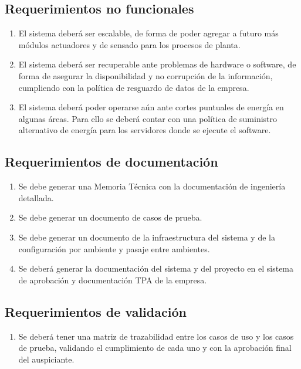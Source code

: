 \subsection{Requerimientos no funcionales}
\begin{enumerate}[label=2.\arabic*]
\item El sistema deberá ser escalable, de forma de poder agregar a futuro más módulos actuadores y de sensado para los procesos de planta.
\item El sistema deberá ser recuperable ante problemas de hardware o software, de forma de asegurar la disponibilidad y no corrupción de la información, cumpliendo con la política de resguardo de datos de la empresa.
\item El sistema deberá poder operarse aún ante cortes puntuales de energía en algunas áreas. Para ello se deberá contar con una política de suministro alternativo de energía para los servidores donde se ejecute el software. 
\end{enumerate}
\subsection{Requerimientos de documentación}
\begin{enumerate}[label=3.\arabic*]
\item Se debe generar una Memoria Técnica con la documentación de ingeniería detallada.
\item Se debe generar un documento de casos de prueba.
\item Se debe generar un documento de la infraestructura del sistema y de la configuración por ambiente y pasaje entre ambientes.
\item Se deberá generar la documentación del sistema y del proyecto en el sistema de aprobación y documentación TPA de la empresa.
\end{enumerate}
\subsection{Requerimientos de validación}
\begin{enumerate}[label=4.\arabic*]
\item Se deberá tener una matriz de trazabilidad entre los casos de uso y los casos de prueba, validando el cumplimiento de cada uno y con la aprobación final del auspiciante.
\end{enumerate}

